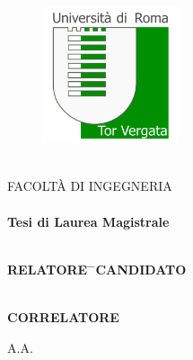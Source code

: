 

\begin{titlepage}

\pagestyle{empty}

\begin{figure}[H]
    \begin{center}
        \includegraphics[height=4cm]{figs/logo_utv_square.png}
    \end{center}
\end{figure}

\begin{center}
    \Large{\textbf{\UNIVERSITA}} \\ \vspace{0.5cm}
    \Large{FACOLT\`A DI INGEGNERIA} \\ \vspace{1.5cm}
    \Large{\CORSO} \\ \vspace{1.5cm}
    \textbf{Tesi di Laurea Magistrale} \\ \vspace{1.0cm}
    \LARGE{\textbf{\Titolo}} \\ \vspace{1.5cm}

    \large
    \begin{tabbing}
        \textbf{RELATORE} \= \hspace{9cm} \= \hfill \textbf{CANDIDATO}\\ \\
        \relatore \>  \> \autore
    \end{tabbing}
    \vspace{0.1cm}
    \begin{tabbing}
        \textbf{CORRELATORE}
    \end{tabbing}
    \begin{tabbing}
        \correlatore
    \end{tabbing}

    \vspace{0.1cm}
    \vfill
    \Large{A.A. \anno}
\end{center}

\end{titlepage}

\restoregeometry

